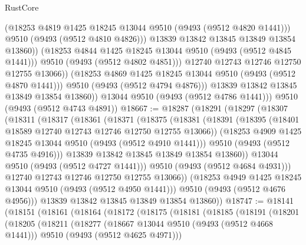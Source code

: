 \begin{lexlean}{RustCore}
\begin{coremodule}
                        (@18253 @4819 @1425 @18245 @13044 @9510 (@9493 (@9512 @4820 @1441)))
                        @9510
                        (@9493 (@9512 @4810 @4826)))
                      @13839
                      @13842
                      @13845
                      @13849
                      @13854
                      @13860))
                  (@18253 @4844 @1425 @18245 @13044 @9510 (@9493 (@9512 @4845 @1441)))
                  @9510
                  (@9493 (@9512 @4802 @4851)))
                @12740
                @12743
                @12746
                @12750
                @12755
                @13066))
            (@18253 @4869 @1425 @18245 @13044 @9510 (@9493 (@9512 @4870 @1441)))
            @9510
            (@9493 (@9512 @4794 @4876)))
          @13839
          @13842
          @13845
          @13849
          @13854
          @13860))
      @13044
      @9510
      (@9493 (@9512 @4786 @1441)))
    @9510
    (@9493 (@9512 @4743 @4891))
@18667 := @18287
    (@18291
      (@18297
        (@18307
          (@18311
            (@18317
              (@18361
                (@18371
                  (@18375
                    (@18381
                      (@18391
                        (@18395 (@18401 @18589 @12740 @12743 @12746 @12750 @12755 @13066))
                        (@18253 @4909 @1425 @18245 @13044 @9510 (@9493 (@9512 @4910 @1441)))
                        @9510
                        (@9493 (@9512 @4735 @4916)))
                      @13839
                      @13842
                      @13845
                      @13849
                      @13854
                      @13860))
                  @13044
                  @9510
                  (@9493 (@9512 @4727 @1441)))
                @9510
                (@9493 (@9512 @4684 @4931)))
              @12740
              @12743
              @12746
              @12750
              @12755
              @13066))
          (@18253 @4949 @1425 @18245 @13044 @9510 (@9493 (@9512 @4950 @1441)))
          @9510
          (@9493 (@9512 @4676 @4956)))
        @13839
        @13842
        @13845
        @13849
        @13854
        @13860))
@18747 := @18141
    (@18151
      (@18161
        (@18164
          (@18172
            (@18175
              (@18181
                (@18185
                  (@18191
                    (@18201
                      (@18205
                        (@18211
                          (@18277
                            (@18667 @13044 @9510 (@9493 (@9512 @4668 @1441)))
                            @9510
                            (@9493 (@9512 @4625 @4971)))

\end{coremodule}
\end{lexlean}
